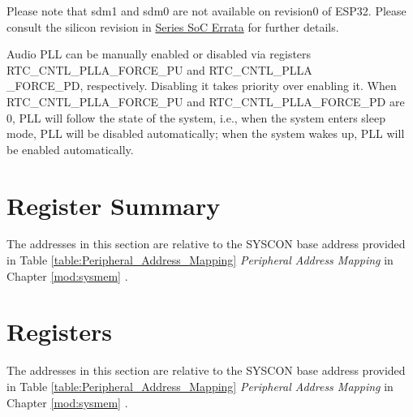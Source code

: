\documentclass[main\_\_EN.tex]{subfiles}
\begin{document}
Please note that sdm1 and sdm0 are not available on revision0 of ESP32. Please consult the silicon revision in \href{\linkprefix\linkchiperrataEN}{\chipseries{} Series SoC Errata} for further details.

Audio PLL can be manually enabled or disabled via registers RTC\_CNTL\_PLLA\_FORCE\_PU and RTC\_CNTL\_PLLA\\\_FORCE\_PD, respectively. Disabling it takes priority over enabling it. When RTC\_CNTL\_PLLA\_FORCE\_PU and RTC\_CNTL\_PLLA\_FORCE\_PD are 0, PLL will follow the state of the system, i.e., when the system enters sleep mode, PLL will be disabled automatically; when the system wakes up, PLL will be enabled automatically.

\section{Register Summary}\label{sec:resclk-reg-summ}

The addresses in this section are relative to the SYSCON base address provided in Table \ref{table:Peripheral_Address_Mapping} \textit{Peripheral Address Mapping} in Chapter \ref{mod:sysmem} \textit{}.



\section{Registers}

The addresses in this section are relative to the SYSCON base address provided in Table \ref{table:Peripheral_Address_Mapping} \textit{Peripheral Address Mapping} in Chapter \ref{mod:sysmem} \textit{}.


\end{document}
